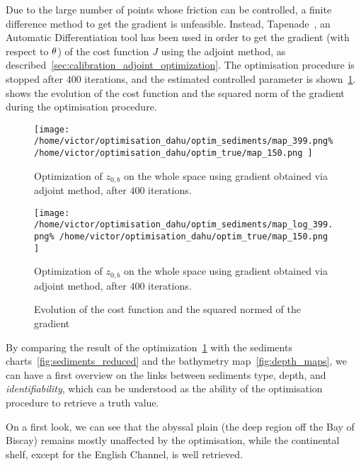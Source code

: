 \documentclass[../../Main_ManuscritThese.tex]{subfiles}
\newcommand{\zob}{z_{0,b}}
\begin{document}
Due to the large number of points whose friction can be controlled, a
finite difference method to get the gradient is unfeasible. Instead,
Tapenade~\citep{hascoet_tapenade_2013}, an Automatic Differentiation
tool has been used in order to get the gradient (with respect to
$\theta$) of the cost function $J$ using the adjoint method, as
described~\cref{sec:calibration_adjoint_optimization}. The
optimisation procedure is stopped after \num{400} iterations, and the
estimated controlled parameter is
shown~\cref{fig:optimization_map_399}.   shows the
evolution of the cost function and the squared norm of the gradient
during the optimisation procedure.  
 \begin{figure}[ht]
   \centering
   \texttt{[image: /home/victor/optimisation\_dahu/optim\_sediments/map\_399.png\% /home/victor/optimisation\_dahu/optim\_true/map\_150.png
   ]}
  \caption{\label{fig:optimization_map_399} Optimization of $\zob$ on
    the whole space using gradient obtained via adjoint method, after
    $400$ iterations.}
\end{figure}

 \begin{figure}[ht]
   \centering
   \texttt{[image: /home/victor/optimisation\_dahu/optim\_sediments/map\_log\_399.png\% /home/victor/optimisation\_dahu/optim\_true/map\_150.png
   ]}
  \caption{\label{fig:optimization_map_399_log} Optimization of $\zob$ on
    the whole space using gradient obtained via adjoint method, after
    $400$ iterations.}
\end{figure}

 \begin{figure}[ht]
  \centering
  
  \caption{\label{fig:ctrl_true} Evolution of the cost function and
    the squared normed of the gradient}
\end{figure}
By comparing the result of the
optimization~\cref{fig:optimization_map_399} with the sediments
charts~\cref{fig:sediments_reduced} and the bathymetry
map~\cref{fig:depth_maps}, we can have a first overview on the links
between sediments type, depth, and \emph{identifiability}, which can
be understood as the ability of the optimisation procedure to retrieve
a truth value.

On a first look, we can see that the abyssal plain (the deep region
off the Bay of Biscay) remains mostly unaffected by the optimisation,
while the continental shelf, except for the English Channel, is
well retrieved. %
\end{document}
